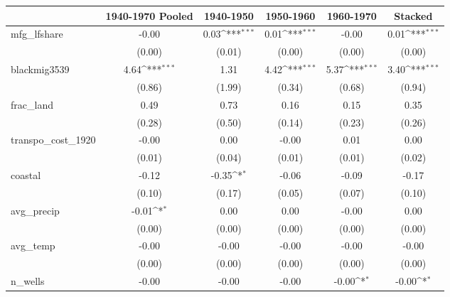 {
\def\sym#1{\ifmmode^{#1}\else\(^{#1}\)\fi}
\begin{tabular}{l*{5}{c}}
\toprule
          &\multicolumn{1}{c}{1940-1970 Pooled}&\multicolumn{1}{c}{1940-1950}&\multicolumn{1}{c}{1950-1960}&\multicolumn{1}{c}{1960-1970}&\multicolumn{1}{c}{Stacked}\\
\midrule
mfg\_lfshare&    -0.00         &     0.03\sym{***}&     0.01\sym{***}&    -0.00         &     0.01\sym{***}\\
          &   (0.00)         &   (0.01)         &   (0.00)         &   (0.00)         &   (0.00)         \\
\addlinespace
blackmig3539&     4.64\sym{***}&     1.31         &     4.42\sym{***}&     5.37\sym{***}&     3.40\sym{***}\\
          &   (0.86)         &   (1.99)         &   (0.34)         &   (0.68)         &   (0.94)         \\
\addlinespace
frac\_land &     0.49         &     0.73         &     0.16         &     0.15         &     0.35         \\
          &   (0.28)         &   (0.50)         &   (0.14)         &   (0.23)         &   (0.26)         \\
\addlinespace
transpo\_cost\_1920&    -0.00         &     0.00         &    -0.00         &     0.01         &     0.00         \\
          &   (0.01)         &   (0.04)         &   (0.01)         &   (0.01)         &   (0.02)         \\
\addlinespace
coastal   &    -0.12         &    -0.35\sym{*}  &    -0.06         &    -0.09         &    -0.17         \\
          &   (0.10)         &   (0.17)         &   (0.05)         &   (0.07)         &   (0.10)         \\
\addlinespace
avg\_precip&    -0.01\sym{*}  &     0.00         &     0.00         &    -0.00         &     0.00         \\
          &   (0.00)         &   (0.00)         &   (0.00)         &   (0.00)         &   (0.00)         \\
\addlinespace
avg\_temp  &    -0.00         &    -0.00         &    -0.00         &    -0.00         &    -0.00         \\
          &   (0.00)         &   (0.00)         &   (0.00)         &   (0.00)         &   (0.00)         \\
\addlinespace
n\_wells   &    -0.00         &    -0.00         &    -0.00         &    -0.00\sym{*}  &    -0.00\sym{*}  \\

\end{tabular}}
